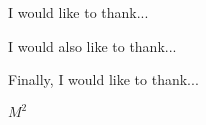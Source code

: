  


I would like to thank...

I would also like to thank...

Finally, I would like to thank...

$M^2$